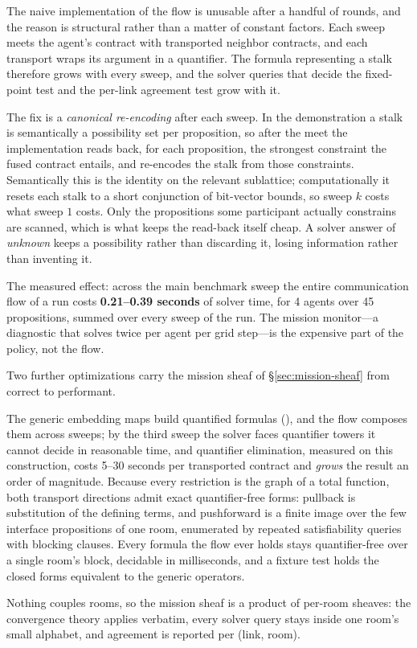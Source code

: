 \documentclass[11pt]{article}
\theoremstyle{definition}
\theoremstyle{remark}
\begin{document}
The naive implementation of the flow is unusable after a handful of rounds, and the reason is
structural rather than a matter of constant factors.
Each sweep meets the agent's contract with transported neighbor contracts, and each transport
wraps its argument in a quantifier.
The formula representing a stalk therefore grows with every sweep, and the solver queries that
decide the fixed-point test and the per-link agreement test grow with it.

The fix is a \emph{canonical re-encoding} after each sweep.
In the demonstration a stalk is semantically a possibility set per proposition, so after the
meet the implementation reads back, for each proposition, the strongest constraint the fused
contract entails, and re-encodes the stalk from those constraints.
Semantically this is the identity on the relevant sublattice; computationally it resets each
stalk to a short conjunction of bit-vector bounds, so sweep $k$ costs what sweep $1$ costs.
Only the propositions some participant actually constrains are scanned, which is what keeps the
read-back itself cheap.
A solver answer of \emph{unknown} keeps a possibility rather than discarding it, losing
information rather than inventing it.

The measured effect: across the main benchmark sweep the entire communication flow of a run
costs \textbf{0.21--0.39 seconds} of solver time, for 4 agents over 45 propositions, summed over
every sweep of the run.
The mission monitor---a diagnostic that solves twice per agent per grid step---is the expensive
part of the policy, not the flow.

Two further optimizations carry the mission sheaf of \S\ref{sec:mission-sheaf} from correct to
performant.
\begin{description}[leftmargin=1.6em]
\item[Closed-form transport.] The generic embedding maps build quantified formulas
  (), and the flow composes them across sweeps; by the third sweep
  the solver faces quantifier towers it cannot decide in reasonable time, and quantifier
  elimination, measured on this construction, costs 5--30 seconds per transported contract and
  \emph{grows} the result an order of magnitude.
  Because every restriction is the graph of a total function, both transport directions admit
  exact quantifier-free forms: pullback is substitution of the defining terms, and pushforward
  is a finite image over the few interface propositions of one room, enumerated by repeated
  satisfiability queries with blocking clauses.
  Every formula the flow ever holds stays quantifier-free over a single room's block, decidable
  in milliseconds, and a fixture test holds the closed forms equivalent to the generic
  operators.
\item[Product structure.] Nothing couples rooms, so the mission sheaf is a product of per-room
  sheaves: the convergence theory applies verbatim, every solver query stays inside one room's
  small alphabet, and agreement is reported per (link, room).
\end{description}
\end{document}
